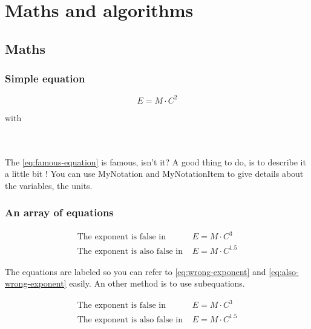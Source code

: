 \section{Maths and algorithms}
\label{sec:mathandalgo}

\lipsum[149]

\subsection{Maths}

\lipsum[143]

\subsubsection{Simple equation}

\begin{equation}\label{eq:famous-equation}
    E= M \cdot C^2
\end{equation}

\begin{MyNotation}{with}
    \\
    \\
    \\
\end{MyNotation}

The \ref{eq:famous-equation} is famous, isn't it? A good thing to do, is to describe it a little bit ! You can use MyNotation and MyNotationItem to give details about the variables, the units.

\subsubsection{An array of equations}

\begin{eqnarray}
   \text{The exponent is false in } & E = M \cdot C^3 
   \label{eq:wrong-exponent} \\
   \text{The exponent is also false in } & E = M \cdot C^{1.5}
   \label{eq:also-wrong-exponent}
\end{eqnarray}

The equations are labeled so you can refer to \ref{eq:wrong-exponent} and \ref{eq:also-wrong-exponent} easily. An other method is to use subequations.

\begin{subequations}
    \begin{align}
        \text{The exponent is false in } & E = M \cdot C^3  \label{eq:subequation_a} \\
        \text{The exponent is also false in } & E = M \cdot C^{1.5} \label{eq:subequation_b}
    \end{align}
\end{subequations}

